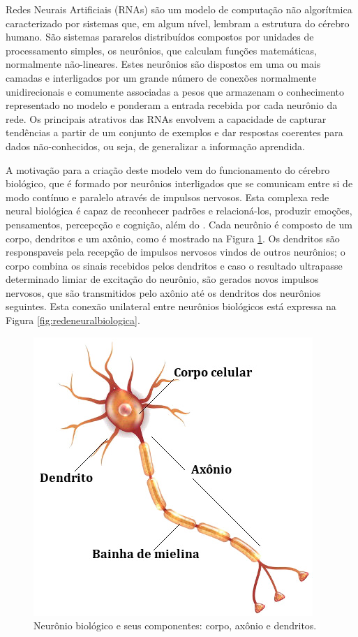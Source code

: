 
Redes Neurais Artificiais (RNAs) são um modelo de computação não algorítmica caracterizado por sistemas que, em algum nível, lembram a estrutura do cérebro humano. São sistemas pararelos distribuídos compostos por unidades de processamento simples, os neurônios, que calculam funções matemáticas, normalmente não-lineares. Estes neurônios são dispostos em uma ou mais camadas e interligados por um grande número de conexões normalmente unidirecionais e comumente associadas a pesos que armazenam o conhecimento representado no modelo e ponderam a entrada recebida por cada neurônio da rede. Os principais atrativos das RNAs envolvem a capacidade de capturar tendências a partir de um conjunto de exemplos e dar respostas coerentes para dados não-conhecidos, ou seja, de generalizar a informação aprendida.

A motivação para a criação deste modelo vem do funcionamento do cérebro biológico, que é formado por neurônios interligados que se comunicam entre si de modo contínuo e paralelo através de impulsos nervosos. Esta complexa rede neural biológica é capaz de reconhecer padrões e relacioná-los, produzir emoções, pensamentos, percepcção e cognição, além do . Cada neurônio é composto de um corpo, dendritos e um axônio, como é mostrado na Figura \ref{fig:neuronio_biologico}. Os dendritos são responspaveis pela recepção de impulsos nervosos vindos de outros neurônios; o corpo combina os sinais recebidos pelos dendritos e caso o resultado ultrapasse determinado limiar de excitação do neurônio, são gerados novos impulsos nervosos, que são transmitidos pelo axônio até os dendritos dos neurônios seguintes. Esta conexão unilateral entre neurônios biológicos está expressa na Figura \ref{fig:redeneuralbiologica}.

\begin{figure}[ht]
	\centering
	\includegraphics[height=0.3\textheight]{img/neuronio}
	\caption{Neurônio biológico e seus componentes: corpo, axônio e dendritos.}
	\label{fig:neuronio_biologico}
\end{figure}


